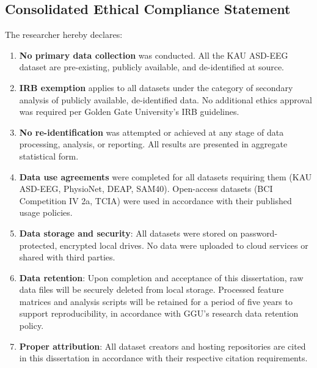 \subsection{Consolidated Ethical Compliance Statement}
\label{sec:ethics_statement}

The researcher hereby declares:

\begin{enumerate}
    \item \textbf{No primary data collection} was conducted. All the KAU ASD-EEG dataset are pre-existing, publicly available, and de-identified at source.

    \item \textbf{IRB exemption} applies to all datasets under the category of secondary analysis of publicly available, de-identified data. No additional ethics approval was required per Golden Gate University's IRB guidelines.

    \item \textbf{No re-identification} was attempted or achieved at any stage of data processing, analysis, or reporting. All results are presented in aggregate statistical form.

    \item \textbf{Data use agreements} were completed for all datasets requiring them (KAU ASD-EEG, PhysioNet, DEAP, SAM40). Open-access datasets (BCI Competition IV 2a, TCIA) were used in accordance with their published usage policies.

    \item \textbf{Data storage and security}: All datasets were stored on password-protected, encrypted local drives. No data were uploaded to cloud services or shared with third parties.

    \item \textbf{Data retention}: Upon completion and acceptance of this dissertation, raw data files will be securely deleted from local storage. Processed feature matrices and analysis scripts will be retained for a period of five years to support reproducibility, in accordance with GGU's research data retention policy.

    \item \textbf{Proper attribution}: All dataset creators and hosting repositories are cited in this dissertation in accordance with their respective citation requirements.
\end{enumerate}

